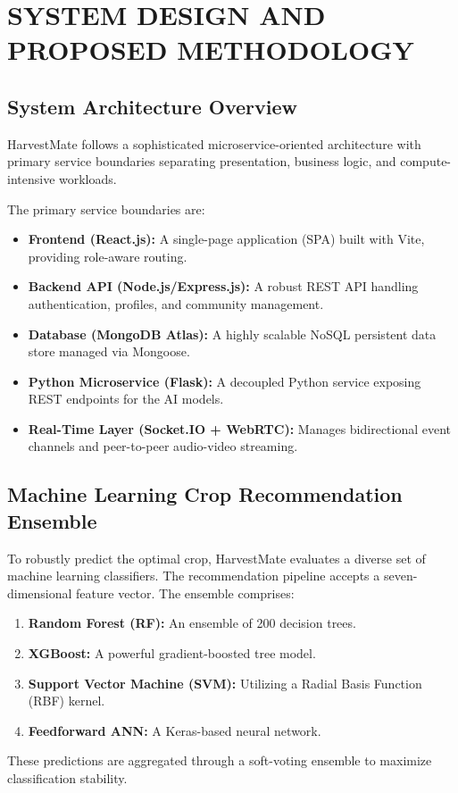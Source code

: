 \documentclass[12pt,a4paper]{report}
\begin{document}
\chapter{SYSTEM DESIGN AND PROPOSED METHODOLOGY}

\section{System Architecture Overview}
HarvestMate follows a sophisticated microservice-oriented architecture with primary service boundaries separating presentation, business logic, and compute-intensive workloads.

The primary service boundaries are:
\begin{itemize}
    \item \textbf{Frontend (React.js):} A single-page application (SPA) built with Vite, providing role-aware routing.
    \item \textbf{Backend API (Node.js/Express.js):} A robust REST API handling authentication, profiles, and community management.
    \item \textbf{Database (MongoDB Atlas):} A highly scalable NoSQL persistent data store managed via Mongoose.
    \item \textbf{Python Microservice (Flask):} A decoupled Python service exposing REST endpoints for the AI models.
    \item \textbf{Real-Time Layer (Socket.IO + WebRTC):} Manages bidirectional event channels and peer-to-peer audio-video streaming.
\end{itemize}

\section{Machine Learning Crop Recommendation Ensemble}
To robustly predict the optimal crop, HarvestMate evaluates a diverse set of machine learning classifiers. The recommendation pipeline accepts a seven-dimensional feature vector.
The ensemble comprises:
\begin{enumerate}
    \item \textbf{Random Forest (RF):} An ensemble of 200 decision trees.
    \item \textbf{XGBoost:} A powerful gradient-boosted tree model.
    \item \textbf{Support Vector Machine (SVM):} Utilizing a Radial Basis Function (RBF) kernel.
    \item \textbf{Feedforward ANN:} A Keras-based neural network.
\end{enumerate}
These predictions are aggregated through a soft-voting ensemble to maximize classification stability.
\end{document}
